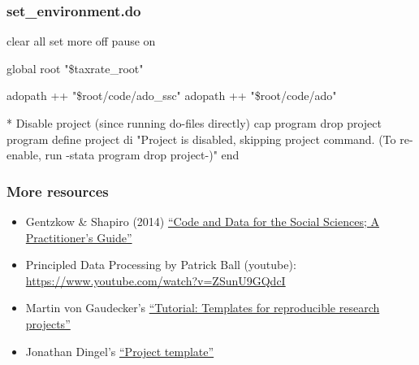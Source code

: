 \documentclass{beamer}
\begin{document}
\frame
{
	\frametitle{set\_environment.do}
clear all \linebreak
set more off \linebreak
pause on \linebreak

global root "\${taxrate\_root}" \linebreak

adopath ++ "\$root/code/ado\_ssc" \linebreak
adopath ++ "\$root/code/ado" \linebreak

* Disable project (since running do-files directly) \linebreak
cap program drop project \linebreak
program define project \linebreak
di "Project is disabled, skipping project command. (To re-enable, run -{stata program drop project}-)" \linebreak
end

	
}


\frame
{
	\frametitle{More resources}
	
	\begin{itemize}
		\item Gentzkow \& Shapiro (2014)  \href{http://web.stanford.edu/~gentzkow/research/CodeAndData.pdf}{``Code and Data for the Social Sciences; A Practitioner's Guide''}
		\item Principled Data Processing by Patrick Ball (youtube): \href{https://www.youtube.com/watch?v=ZSunU9GQdcI}{https://www.youtube.com/watch?v=ZSunU9GQdcI}
		\item Martin von Gaudecker's \href{https://econ-project-templates.readthedocs.io/en/stable/}{``Tutorial: Templates for reproducible research projects''} 
		\item Jonathan Dingel's \href{https://github.com/jdingel/projecttemplate}{``Project template''}
	\end{itemize}	
	
}
\end{document}
